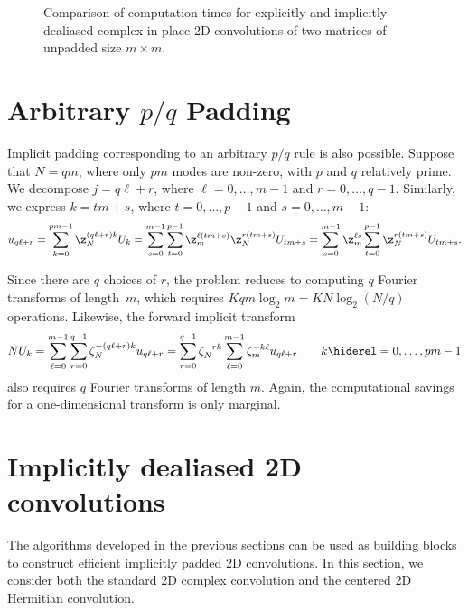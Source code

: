 \documentclass[final]{siamltex}
\def\no{\hiderel}
\begin{document}
\begin{figure}[htbp]
\begin{minipage}{0.5\linewidth}
\begin{center}
\caption{Comparison of computation times for explicitly and implicitly
dealiased complex in-place 2D convolutions of two matrices of
unpadded size $m\times m$.}
\label{timing2c}
\end{center}
\end{minipage}
\end{figure}

\section{Arbitrary $p/q$ Padding}

Implicit padding corresponding to an arbitrary $p/q$ rule is also
possible. Suppose that $N=qm$, where only $pm$ modes are non-zero, with $p$
and $q$ relatively prime. We decompose $j=q\ell+r$, where
$\ell=0,\dots,m-1$ and $r=0,\dots,q-1$.
Similarly, we express $k=t m+s$, where $t=0,\dots,p-1$ and $s=0,\dots, m-1$:
$$
u_{q\ell+r}=\sum_{k=0}^{pm-1}\z_N^{(q\ell+r)k} U_k
=\sum_{s=0}^{m-1}\sum_{t=0}^{p-1} \z_m^{\ell (t m+s)}\z_{N}^{r(t m+s)}
U_{t m+s}
=\sum_{s=0}^{m-1}\z_m^{\ell s}\sum_{t=0}^{p-1}\z_N^{r(t m+s)} U_{t m+s}.
$$

Since there are $q$ choices of $r$, the problem reduces
to computing $q$ Fourier transforms of length~$m$, which requires
$K q m\log_2 m=K N\log_2 (N/q)$ operations. 
Likewise, the forward implicit transform
$$
NU_k
=\sum_{\ell=0}^{m-1}\sum_{r=0}^{q-1} \zeta_N^{-(q\ell+r)k} u_{q\ell+r}
=\sum_{r=0}^{q-1}\zeta_N^{-rk}\sum_{\ell=0}^{m-1}\zeta_m^{-k\ell} u_{q\ell+r}
\qquad k\no =0,\ldots,pm-1
$$
also requires $q$ Fourier transforms of length $m$. Again, the computational
savings for a one-dimensional transform is only marginal.

\section{Implicitly dealiased 2D convolutions}\label{2d}
The algorithms developed in the previous sections can be used as building
blocks to construct efficient implicitly padded 2D convolutions.
In this section, we consider both the standard 2D complex convolution and the
centered 2D Hermitian convolution.
\end{document}
